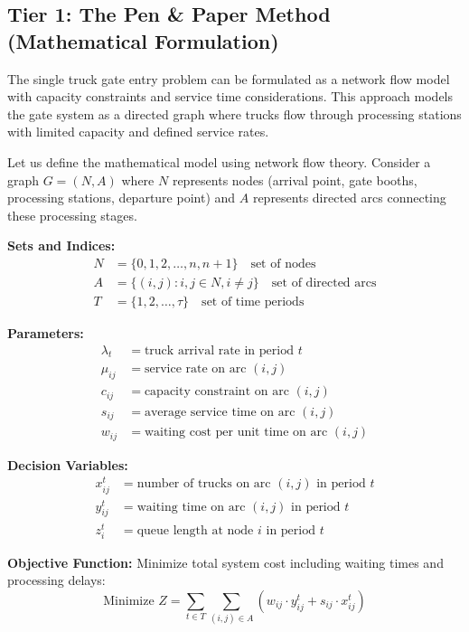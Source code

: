 \documentclass{article}
\begin{document}
\subsection{Tier 1: The Pen \& Paper Method (Mathematical Formulation)}

The single truck gate entry problem can be formulated as a network flow model with capacity constraints and service time considerations. This approach models the gate system as a directed graph where trucks flow through processing stations with limited capacity and defined service rates.

Let us define the mathematical model using network flow theory. Consider a graph $G = (N, A)$ where $N$ represents nodes (arrival point, gate booths, processing stations, departure point) and $A$ represents directed arcs connecting these processing stages.

\textbf{Sets and Indices:}
\begin{align}
N &= \{0, 1, 2, \ldots, n, n+1\} \quad \text{set of nodes} \\
A &= \{(i,j) : i,j \in N, i \neq j\} \quad \text{set of directed arcs} \\
T &= \{1, 2, \ldots, \tau\} \quad \text{set of time periods}
\end{align}

\textbf{Parameters:}
\begin{align}
\lambda_t &= \text{truck arrival rate in period } t \\
\mu_{ij} &= \text{service rate on arc } (i,j) \\
c_{ij} &= \text{capacity constraint on arc } (i,j) \\
s_{ij} &= \text{average service time on arc } (i,j) \\
w_{ij} &= \text{waiting cost per unit time on arc } (i,j)
\end{align}

\textbf{Decision Variables:}
\begin{align}
x_{ij}^t &= \text{number of trucks on arc } (i,j) \text{ in period } t \\
y_{ij}^t &= \text{waiting time on arc } (i,j) \text{ in period } t \\
z_i^t &= \text{queue length at node } i \text{ in period } t
\end{align}

\textbf{Objective Function:}
Minimize total system cost including waiting times and processing delays:
\begin{equation}
\text{Minimize } Z = \sum_{t \in T} \sum_{(i,j) \in A} \left( w_{ij} \cdot y_{ij}^t + s_{ij} \cdot x_{ij}^t \right)
\end{equation}
\end{document}
